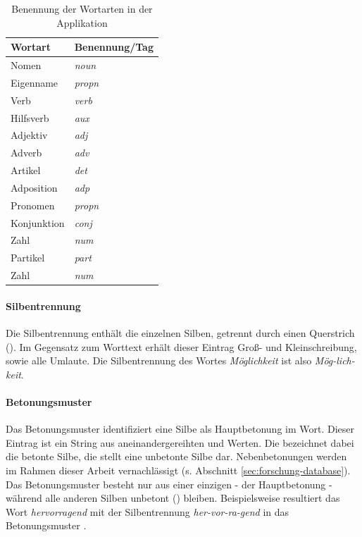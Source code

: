 \begin{table}[h!]
	\centering
	\begin{tabular}{|l|l|}
		\hline
		Wortart & Benennung/Tag \\
		\hline
		\hline
		Nomen & \textit{noun}\\
		Eigenname & \textit{propn}\\
		Verb & \textit{verb}\\
		Hilfsverb & \textit{aux}\\
		Adjektiv & \textit{adj}\\
		Adverb & \textit{adv}\\
		Artikel & \textit{det}\\
		Adposition & \textit{adp}\\
		Pronomen & \textit{propn}\\
		Konjunktion & \textit{conj}\\
		Zahl & \textit{num}\\
		Partikel & \textit{part}\\
		Zahl & \textit{num}\\
		\hline
	\end{tabular}
	\caption{Benennung der Wortarten in der Applikation}
\end{table}

\paragraph{Silbentrennung}
Die Silbentrennung enthält die einzelnen Silben, getrennt durch einen Querstrich (\qq{-}). Im Gegensatz zum Worttext erhält dieser Eintrag Groß- und Kleinschreibung, sowie alle Umlaute. Die Silbentrennung des Wortes \textit{Möglichkeit} ist also \textit{Mög-lich-keit}.

\paragraph{Betonungsmuster}
Das Betonungsmuster identifiziert eine Silbe als Hauptbetonung im Wort. Dieser Eintrag ist ein String aus aneinandergereihten  und  Werten. Die  bezeichnet dabei die betonte Silbe, die  stellt eine unbetonte Silbe dar. Nebenbetonungen werden im Rahmen dieser Arbeit vernachlässigt (s. Abschnitt \ref{sec:forschung-database}). Das Betonungsmuster besteht nur aus einer einzigen  - der Hauptbetonung - während alle anderen Silben unbetont () bleiben. Beispielsweise resultiert das Wort \textit{hervorragend} mit der Silbentrennung \textit{her-vor-ra-gend} in das Betonungsmuster .

